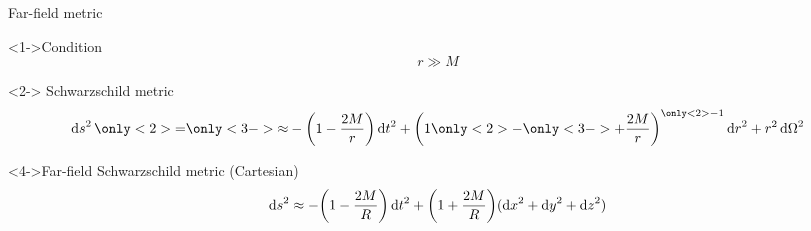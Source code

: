 \documentclass{beamer}
\let\svthefootnote\thefootnote
\newcommand\blankfootnote[1]{%
  \let\thefootnote\relax\footnotetext{#1}%
  \let\thefootnote\svthefootnote%
}
\begin{document}
\begin{frame}{Far-field metric}

\begin{block}<1->{Condition}
\begin{displaymath}
  r \gg M
\end{displaymath}
\end{block}

\begin{block}<2->{ Schwarzschild metric}
\begin{displaymath}
  \dd{s}^2 \only<2>{=} \only<3->{\approx}
 -\qty(1 - \frac{2M}{r}) \dd{t}^2 +
  \qty(1 \only<2>{-} \only<3->{+} \frac{2M}{r})^{\only<2>{-1}{}} \dd{r}^2 +
  r^2 \dd{\Omega}^2
\end{displaymath}
\end{block}

\begin{block}<4->{Far-field Schwarzschild metric (Cartesian)}
\begin{displaymath}
  \dd{s}^2 \approx
 -\qty(1 - \frac{2M}{R}) \dd{t}^2 +
  \qty(1 + \frac{2M}{R}) (\dd{x}^2 + \dd{y}^2 + \dd{z}^2)
\end{displaymath}
\end{block}


\blankfootnote{\textcite[pp. 263]{Schutz}}



\end{frame}

\end{document}
